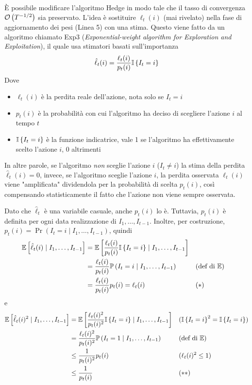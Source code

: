 \`E possibile modificare l'algoritmo Hedge in modo tale che il tasso di convergenza $\mathcal{O} \left(T^{-1/2}\right)$ sia preservato. L'idea è sostituire $\ell_t (i)$ (mai rivelato) nella fase di aggiornamento dei pesi (Linea 5) con una stima. Questo viene fatto da un algoritmo chiamato Exp3 (\textit{Exponential-weight algorithm for Exploration and Exploitation}), il quale usa stimatori basati sull'importanza
$$ \hat \ell_t (i) = \frac{\ell_t (i)}{p_t (i)} \mathbb{I} \left\{I_t = i\right\} $$
Dove
\begin{itemize}
	\item $\ell_t (i)$ è la perdita reale dell'azione, nota solo se $I_t = i$
	
	\item $p_t(i)$ è la probabilità con cui l'algoritmo ha deciso di scegliere l'azione $i$ al tempo $t$
	
	\item $\mathbb{I} \left\{I_t = i\right\}$ è la funzione indicatrice, vale 1 se l'algoritmo ha effettivamente scelto l'azione $i$, 0 altrimenti
\end{itemize}
In altre parole, se l'algoritmo \textit{non} sceglie l'azione $i$ ($I_t \neq i$) la stima della perdita $\hat \ell_t (i) = 0$, invece, se l'algoritmo sceglie l'azione $i$, la perdita osservata $\ell_t (i)$ viene "amplificata" dividendola per la probabilità di scelta $p_t (i)$, così compensando statisticamente il fatto che l'azione non viene sempre osservata.

Dato che $\hat \ell_t$ è una variabile casuale, anche $p_t (i)$ lo è. Tuttavia, $p_t (i)$ è definita per ogni data realizzazione di $I_1, \dots, I_{t-1}$. Inoltre, per costruzione, $p_t (i) = \Pr \left(I_t = i \mid I_1, \dots, I_{t-1}\right)$, quindi
\begin{align*}
    \mathbb{E} \left[\hat \ell_t (i) \mid I_1, \dots, I_{t-1}\right] & = \mathbb{E} \left[\frac{\ell_t (i)}{p_t (i)} \mathbb{I} \left\{I_t = i\right\} \mid I_1, \dots, I_{t-1}\right] \\
    & = \frac{\ell_t (i)}{p_t(i)} \mathbb{P} \left(I_t = i \mid I_1, \dots, I_{t-1}\right) && (\text{def di } \mathbb{E}) \\
    & = \frac{\ell_t (i)}{p_t (i)} p_t(i) = \ell_t (i) && (\ast)
\end{align*}
e
\begin{align*}
    \mathbb{E} \left[\hat \ell_t (i)^2 \mid I_1, \dots, I_{t-1}\right] & = \mathbb{E} \left[\frac{\ell_t (i)^2}{p_t (i)^2} \mathbb{I} \left\{I_t = i\right\} \mid I_1, \dots, I_{t-1}\right] && (\mathbb{I} \left\{I_t = i\right\}^2 = \mathbb{I} \left\{I_t = i\right\}) \\
    & = \frac{\ell_t (i)^2}{p_t(i)^2} \mathbb{P} \left(I_t = 1 \mid I_1, \dots, I_{t-1}\right) && (\text{def di } \mathbb{E})\\
    & \leq \frac{1}{p_t(i)^2}p_t (i) && (\ell_t (i)^2 \leq 1)\\
    & \leq \frac{1}{p_t (i)} && (\ast \ast)
\end{align*}

